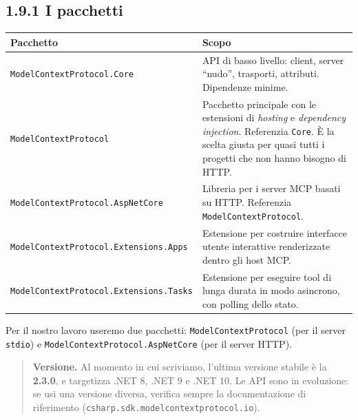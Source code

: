\documentclass[
  italian,
  10pt,
]{book}
\newcounter{none} %
\begin{document}
\subsection{1.9.1 I pacchetti}\label{i-pacchetti}

{\def\LTcaptype{none} %
\begin{longtable}[]{@{}
  >{\raggedright\arraybackslash}p{}
  >{\raggedright\arraybackslash}p{}@{}}
\toprule\noalign{}
\begin{minipage}[b]{\linewidth}\raggedright
Pacchetto
\end{minipage} & \begin{minipage}[b]{\linewidth}\raggedright
Scopo
\end{minipage} \\
\midrule\noalign{}
\endhead
\bottomrule\noalign{}
\endlastfoot
\texttt{ModelContextProtocol.Core} & API di basso livello: client,
server ``nudo'', trasporti, attributi. Dipendenze minime. \\
\texttt{ModelContextProtocol} & Pacchetto principale con le estensioni
di \emph{hosting} e \emph{dependency injection}. Referenzia
\texttt{Core}. È la scelta giusta per quasi tutti i progetti che non
hanno bisogno di HTTP. \\
\texttt{ModelContextProtocol.AspNetCore} & Libreria per i server MCP
basati su HTTP. Referenzia \texttt{ModelContextProtocol}. \\
\texttt{ModelContextProtocol.Extensions.Apps} & Estensione per costruire
interfacce utente interattive renderizzate dentro gli host MCP. \\
\texttt{ModelContextProtocol.Extensions.Tasks} & Estensione per eseguire
tool di lunga durata in modo asincrono, con polling dello stato. \\
\end{longtable}
}

Per il nostro lavoro useremo due pacchetti:
\texttt{ModelContextProtocol} (per il server \texttt{stdio}) e
\texttt{ModelContextProtocol.AspNetCore} (per il server HTTP).

\begin{quote}
\textbf{Versione.} Al momento in cui scriviamo, l'ultima versione
stabile è la \textbf{2.3.0}, e targetizza .NET 8, .NET 9 e .NET 10. Le
API sono in evoluzione: se usi una versione diversa, verifica sempre la
documentazione di riferimento
(\texttt{csharp.sdk.modelcontextprotocol.io}).
\end{quote}
\end{document}
